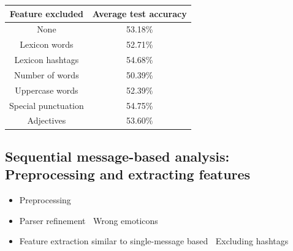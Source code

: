 \documentclass[
paper=128mm:96mm, %
fontsize=11pt, %
pagesize, %
parskip=half-, %
]{scrartcl} %
\newcommand{\red}[1]{\textit{\color{red}{#1}}}
\theoremstyle{mythmstyle} %
\begin{document}
\begin{table}[h]
\centering
\begin{tabular}{c c}
\toprule
\textbf{Feature excluded} & \textbf{Average test accuracy} \\
\midrule
None & 53.18\%\\
Lexicon words & 52.71\%\\
Lexicon hashtags & 54.68\%\\
Number of words & 50.39\%\\
Uppercase words & 52.39\%\\
Special punctuation & 54.75\%\\
Adjectives & 53.60\%\\
\bottomrule 
\end{tabular}
\end{table}



\clearpage


\subsection*{Sequential message-based analysis: Preprocessing and extracting features}

\begin{itemize}
\item Preprocessing
\item Parser refinement
\subitem \textbullet $\:$ Wrong emoticons

\item Feature extraction similar to single-message based
\subitem \textbullet $\:$ Excluding hashtags

\end{itemize}

\clearpage
\end{document}
